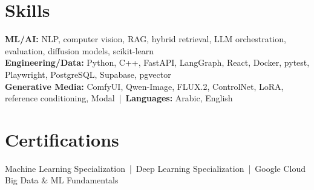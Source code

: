 \documentclass[letterpaper]{article}
\begin{document}
\section*{Skills}
\textbf{ML/AI:} NLP, computer vision, RAG, hybrid retrieval, LLM orchestration, evaluation, diffusion models, scikit-learn\\
\textbf{Engineering/Data:} Python, C++, FastAPI, LangGraph, React, Docker, pytest, Playwright, PostgreSQL, Supabase, pgvector\\
\textbf{Generative Media:} ComfyUI, Qwen-Image, FLUX.2, ControlNet, LoRA, reference conditioning, Modal \,|\, \textbf{Languages:} Arabic, English

\section*{Certifications}
Machine Learning Specialization \,|\, Deep Learning Specialization \,|\, Google Cloud Big Data \& ML Fundamentals
\end{document}
